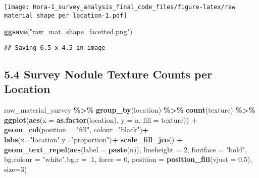 \documentclass[
]{article}
\newenvironment{Shaded}{\begin{snugshade}}{\end{snugshade}}
\newcommand{\AttributeTok}[1]{\textcolor[rgb]{0.13,0.29,0.53}{#1}}
\newcommand{\DecValTok}[1]{\textcolor[rgb]{0.00,0.00,0.81}{#1}}
\newcommand{\FloatTok}[1]{\textcolor[rgb]{0.00,0.00,0.81}{#1}}
\newcommand{\FunctionTok}[1]{\textcolor[rgb]{0.13,0.29,0.53}{\textbf{#1}}}
\newcommand{\NormalTok}[1]{#1}
\newcommand{\SpecialCharTok}[1]{\textcolor[rgb]{0.81,0.36,0.00}{\textbf{#1}}}
\newcommand{\StringTok}[1]{\textcolor[rgb]{0.31,0.60,0.02}{#1}}
\begin{document}
\texttt{[image: Hora-1\_survey\_analysis\_final\_code\_files/figure-latex/raw material shape per location-1.pdf]}

\begin{Shaded}
\begin{Highlighting}[]
\FunctionTok{ggsave}\NormalTok{(}\StringTok{"raw\_mat\_shape\_facetted.png"}\NormalTok{)}
\end{Highlighting}
\end{Shaded}

\begin{verbatim}
## Saving 6.5 x 4.5 in image
\end{verbatim}

\hypertarget{survey-nodule-texture-counts-per-location}{%
\subsection{5.4 Survey Nodule Texture Counts per
Location}\label{survey-nodule-texture-counts-per-location}}

\begin{Shaded}
\begin{Highlighting}[]
\NormalTok{raw\_material\_survey }\SpecialCharTok{\%\textgreater{}\%}
  \FunctionTok{group\_by}\NormalTok{(location) }\SpecialCharTok{\%\textgreater{}\%}
  \FunctionTok{count}\NormalTok{(texture) }\SpecialCharTok{\%\textgreater{}\%}
  \FunctionTok{ggplot}\NormalTok{(}\FunctionTok{aes}\NormalTok{(}\AttributeTok{x =} \FunctionTok{as.factor}\NormalTok{(location), }\AttributeTok{y =}\NormalTok{ n, }\AttributeTok{fill =}\NormalTok{ texture)) }\SpecialCharTok{+}
  \FunctionTok{geom\_col}\NormalTok{(}\AttributeTok{position =} \StringTok{"fill"}\NormalTok{, }\AttributeTok{colour=}\StringTok{"black"}\NormalTok{)}\SpecialCharTok{+}
  \FunctionTok{labs}\NormalTok{(}\AttributeTok{x=}\StringTok{"location"}\NormalTok{,}\AttributeTok{y=}\StringTok{"proportion"}\NormalTok{)}\SpecialCharTok{+}
  \FunctionTok{scale\_fill\_jco}\NormalTok{() }\SpecialCharTok{+}
  \FunctionTok{geom\_text\_repel}\NormalTok{(}\FunctionTok{aes}\NormalTok{(}\AttributeTok{label =} \FunctionTok{paste}\NormalTok{(n)), }
                \AttributeTok{lineheight =} \DecValTok{2}\NormalTok{,}
            \AttributeTok{fontface =} \StringTok{"bold"}\NormalTok{, }\AttributeTok{bg.colour =} \StringTok{"white"}\NormalTok{,}\AttributeTok{bg.r =}\NormalTok{ .}\DecValTok{1}\NormalTok{, }\AttributeTok{force =} \DecValTok{0}\NormalTok{,}
                \AttributeTok{position =} \FunctionTok{position\_fill}\NormalTok{(}\AttributeTok{vjust =} \FloatTok{0.5}\NormalTok{), }\AttributeTok{size=}\DecValTok{3}\NormalTok{)}
\end{Highlighting}
\end{Shaded}
\end{document}
